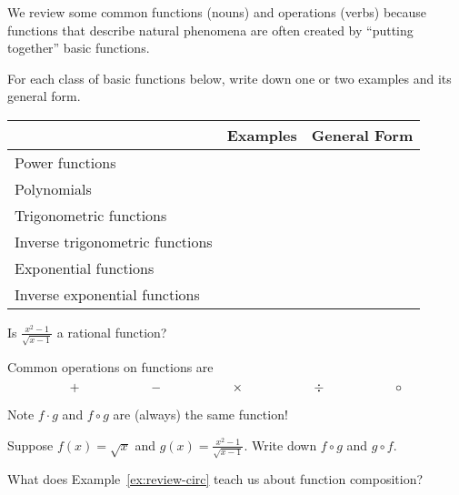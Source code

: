 \documentclass[../main.tex]{subfiles}
\begin{document}
  We review some common functions (nouns) and operations (verbs) because functions that describe natural phenomena are often created by ``putting together'' basic functions.

  \begin{example}
    For each class of basic functions below, write down one or two examples and its general form.

    \begin{center}
      \begin{tabular}{p{1.25in}p{3.5in}|p{1.5in}}
      & Examples & General Form \\\midrule
        Power \newline functions & & \\[0.75in]\midrule
        Polynomials & & \\[0.75in]\midrule
        Trigonometric \newline functions & & \\[0.75in]\midrule
        Inverse \newline trigonometric \newline functions & & \\[0.75in]\midrule
        Exponential \newline functions & & \\[0.75in]\midrule
        Inverse \newline exponential \newline functions & & \\[0.75in]
      \end{tabular}
    \end{center}
  \end{example}

  \faComments{} Is \(\frac{x^{2}-1}{\sqrt{x-1}}\) a rational function?
  \clearpage

  Common operations on functions are
  \[
    + \hspace{0.75in}
    - \hspace{0.75in}
    \times \hspace{0.75in}
    \div \hspace{0.75in}
    \circ
  \]

  \faExclamationTriangle{}
  Note \(f \cdot g\) and \(f \circ g\) are \underline{} (always) the same function!

  \begin{example} \label{ex:review-circ}
    Suppose \(f(x) = \sqrt{x}\) and \(g(x) = \frac{x^{2}-1}{\sqrt{x-1}}\). Write down \(f \circ g\) and \(g \circ f\).

    \faComments{} What does Example~\ref{ex:review-circ} teach us about function composition?
  \end{example}
  \clearpage
\end{document}
